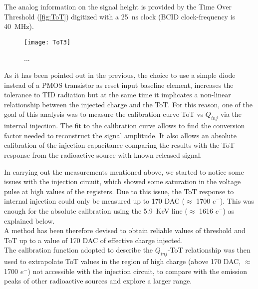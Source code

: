
The analog information on the signal height is provided by the Time Over Threshold (\autoref{fig:ToT}) digitized with a \SI{25}{ns} clock (BCID clock-frequency is \SI{40}{MHz}). 

\begin{figure}
\centering
\texttt{[image: ToT3]}
\caption{...}
\label{fig:ToT}
\end{figure}

As it has been pointed out in the previous, the choice to use a simple diode instead of a PMOS transistor as reset input baseline element, increases the tolerance to TID radiation but at the same time it implicates a non-linear relationship between the injected charge and the ToT. For this reason, one of the goal of this analysis was to measure the calibration curve ToT vs $Q_{inj}$ via the internal injection. The fit to the calibration curve allows to find the conversion factor needed to reconstruct the signal amplitude. It also allows an absolute calibration of the injection capacitance comparing the results with the ToT response from the radioactive source with known released signal.



In carrying out the measurements mentioned above, we started to notice some issues with the injection circuit, which showed some saturation in the voltage pulse at high values of the registers. Due to this issue, the ToT response to internal injection could only be measured up to 170 DAC ($\approx$ 1700 $e^{-}$). This was enough for the absolute calibration using the  \SI{5.9}{KeV} line ($\approx$ 1616 $e^{-}$) as explained below.\\

A method has been therefore devised to obtain reliable values of threshold and ToT up to a value of 170 DAC of effective charge injected.\\

The calibration function adopted to describe the $Q_{inj}$-ToT relationship was then used to extrapolate ToT values in the region of high charge (above 170 DAC, $\approx$ 1700 $e^{-}$) not accessible with the injection circuit, to compare with the emission peaks of other radioactive sources and explore a larger range.


